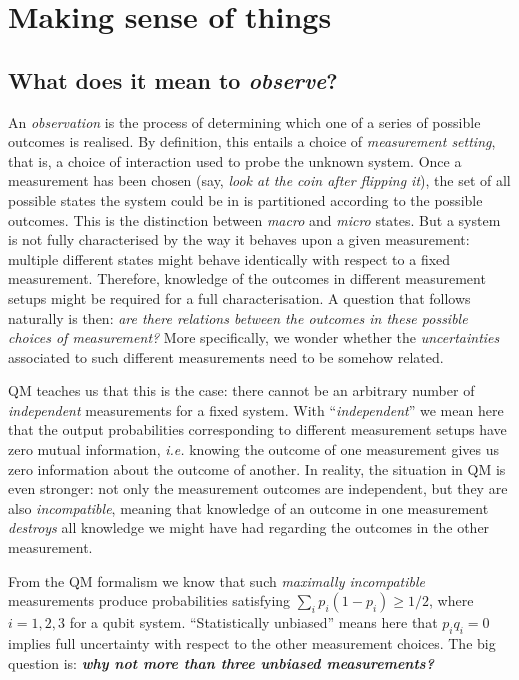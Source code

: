 \documentclass[a4paper]{report}
\begin{document}
\chapter{Making sense of things}

\section{What does it mean to \emph{observe}?}

An \emph{observation} is the process of determining which one of a series of possible outcomes is realised. By definition, this entails a choice of \emph{measurement setting}, that is, a choice of interaction used to probe the unknown system.
Once a measurement has been chosen (say, \emph{look at the coin after flipping it}), the set of all possible states the system could be in is partitioned according to the possible outcomes. This is the distinction between \emph{macro} and \emph{micro} states.
But a system is not fully characterised by the way it behaves upon a given measurement: multiple different states might behave identically with respect to a fixed measurement. Therefore, knowledge of the outcomes in different measurement setups might be required for a full characterisation.
A question that follows naturally is then: \emph{are there relations between the outcomes in these possible choices of measurement?}
More specifically, we wonder whether the \emph{uncertainties} associated to such different measurements need to be somehow related.

QM teaches us that this is the case: there cannot be an arbitrary number of \emph{independent} measurements for a fixed system.
With ``\emph{independent}'' we mean here that the output probabilities corresponding to different measurement setups have zero mutual information, \emph{i.e.} knowing the outcome of one measurement gives us zero information about the outcome of another.
In reality, the situation in QM is even stronger: not only the measurement outcomes are independent, but they are also \emph{incompatible}, meaning that knowledge of an outcome in one measurement \emph{destroys} all knowledge we might have had regarding the outcomes in the other measurement.

From the QM formalism we know that such \emph{maximally incompatible} measurements produce probabilities satisfying $\sum_i p_i (1-p_i)\ge1/2$, where $i=1,2,3$ for a qubit system.
``Statistically unbiased'' means here that $p_i q_i=0$ implies full uncertainty with respect to the other measurement choices. The big question is: \textcolor{RedOrange}{\emph{\textbf{why not more than three unbiased measurements?}}}
\end{document}
